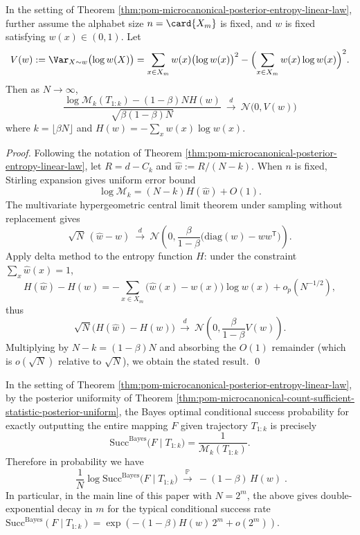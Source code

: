 \begin{theorem}\label{thm:pom-microcanonical-posterior-moduli-clt}
In the setting of Theorem \ref{thm:pom-microcanonical-posterior-entropy-linear-law}, further assume the alphabet size \(n=\card{X_m}\) is fixed, and \(w\) is fixed satisfying \(w(x)\in(0,1)\).
Let
\[
V(w):=\Var_{X\sim w}\bigl(\log w(X)\bigr)
=\sum_{x\in X_m}w(x)\bigl(\log w(x)\bigr)^2-\Bigl(\sum_{x\in X_m}w(x)\log w(x)\Bigr)^2.
\]
Then as \(N\to\infty\),
\[
\boxed{\;
\frac{\log \mathcal{M}_k(T_{1:k})-(1-\beta)NH(w)}{\sqrt{\beta(1-\beta)N}}
\ \xrightarrow{d}\ \mathcal N\bigl(0,V(w)\bigr)\;}
\]
where \(k=\lfloor\beta N\rfloor\) and \(H(w)=-\sum_x w(x)\log w(x)\).
\end{theorem}
\begin{proof}
Following the notation of Theorem \ref{thm:pom-microcanonical-posterior-entropy-linear-law}, let \(R=d-C_k\) and \(\widehat w:=R/(N-k)\).
When \(n\) is fixed, Stirling expansion gives uniform error bound
\[
\log\mathcal{M}_k=(N-k)H(\widehat w)+O(1).
\]
The multivariate hypergeometric central limit theorem under sampling without replacement gives
\[
\sqrt N\,(\widehat w-w)\ \xrightarrow{d}\ \mathcal N\!\left(0,\frac{\beta}{1-\beta}\bigl(\mathrm{diag}(w)-ww^{\mathsf T}\bigr)\right).
\]
Apply delta method to the entropy function \(H\): under the constraint \(\sum_x \widehat w(x)=1\),
\[
H(\widehat w)-H(w)=-\sum_{x\in X_m}\bigl(\widehat w(x)-w(x)\bigr)\log w(x)+o_p(N^{-1/2}),
\]
thus
\[
\sqrt N\bigl(H(\widehat w)-H(w)\bigr)\ \xrightarrow{d}\ \mathcal N\!\left(0,\frac{\beta}{1-\beta}V(w)\right).
\]
Multiplying by \(N-k=(1-\beta)N\) and absorbing the \(O(1)\) remainder (which is \(o(\sqrt N)\) relative to \(\sqrt N\)), we obtain the stated result. \qed
\end{proof}

\begin{corollary}\label{cor:pom-microcanonical-posterior-map-success-double-exponential}
In the setting of Theorem \ref{thm:pom-microcanonical-posterior-entropy-linear-law},
by the posterior uniformity of Theorem \ref{thm:pom-microcanonical-count-sufficient-statistic-posterior-uniform},
the Bayes optimal conditional success probability for exactly outputting the entire mapping \(F\) given trajectory \(T_{1:k}\) is precisely
\[
\mathrm{Succ}^{\mathrm{Bayes}}\bigl(F\mid T_{1:k}\bigr)=\frac{1}{\mathcal{M}_k(T_{1:k})}.
\]
Therefore in probability we have
\[
\boxed{\;
\frac{1}{N}\log \mathrm{Succ}^{\mathrm{Bayes}}\bigl(F\mid T_{1:k}\bigr)
\ \xrightarrow{\ \mathbb{P}\ }\ -(1-\beta)\,H(w)\; } .
\]
In particular, in the main line of this paper with \(N=2^m\), the above gives double-exponential decay in \(m\) for the typical conditional success rate
\(
\mathrm{Succ}^{\mathrm{Bayes}}(F\mid T_{1:k})
=\exp(-(1-\beta)H(w)\,2^m+o(2^m))
\).
\end{corollary}

